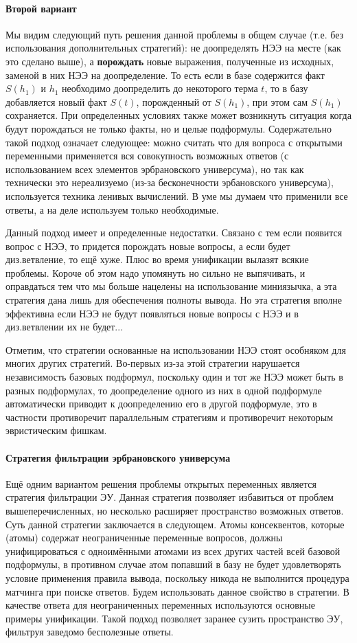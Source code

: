 \paragraph{Второй вариант}
Мы видим следующий путь решения данной проблемы в общем случае (т.е. без использования дополнительных стратегий): не доопределять НЭЭ на месте (как это сделано выше), а \textbf{порождать} новые выражения, полученные из исходных, заменой в них НЭЭ на доопределение. То есть если в базе содержится факт $S(h_1)$ и $h_1$ необходимо доопределить до некоторого терма $t$, то в базу добавляется новый факт $S(t)$, порожденный от $S(h_1)$, при этом сам $S(h_1)$ сохраняется. При определенных условиях также может возникнуть ситуация когда будут порождаться не только факты, но и целые подформулы.
Содержательно такой подход означает следующее: можно считать что для вопроса с открытыми переменными применяется вся совокупность возможных ответов (с использованием всех элементов эрбрановского универсума), но так как технически это нереализуемо (из-за бесконечности эрбановского универсума), используется техника ленивых вычислений. В уме мы думаем что применили все ответы, а на деле используем только необходимые.

Данный подход имеет и определенные недостатки. Связано с тем если появится вопрос с НЭЭ, то придется порождать новые вопросы, а если будет диз.ветвление, то ещё хуже. Плюс во время унификации вылазят всякие проблемы. Короче об этом надо упомянуть но сильно не выпячивать, и оправдаться тем что мы больше нацелены на использование миниязычка, а эта стратегия дана лишь для обеспечения полноты вывода. Но эта стратегия вполне эффективна если НЭЭ не будут появляться новые вопросы с НЭЭ и в диз.ветвлении их не будет...

Отметим, что стратегии основанные на использовании НЭЭ стоят особняком для многих других стратегий. Во-первых из-за этой стратегии нарушается независимость базовых подформул, поскольку один и тот же НЭЭ может быть в разных подформулах, то доопределение одного из них в одной подформуле автоматически приводит к доопределению его в другой подформуле, это в частности противоречит параллельным стратегиям и противоречит некоторым эвристическим фишкам.

\paragraph{Стратегия фильтрации эрбрановского универсума}
Ещё одним вариантом решения проблемы открытых переменных является стратегия фильтрации ЭУ. Данная стратегия позволяет избавиться от проблем вышеперечисленных, но несколько расширяет пространство возможных ответов. Суть данной стратегии заключается в следующем. Атомы консеквентов, которые (атомы) содержат неограниченные переменные вопросов, должны унифицироваться с одноимёнными атомами из всех других частей всей базовой подформулы, в противном случае атом попавший в базу не будет удовлетворять условие применения правила вывода, поскольку никода не выполнится процедура матчинга при поиске ответов. Будем использовать данное свойство в стратегии. В качестве ответа для неограниченных переменных используются основные примеры унификации. Такой подход позволяет заранее сузить пространство ЭУ, фильтруя заведомо бесполезные ответы.

